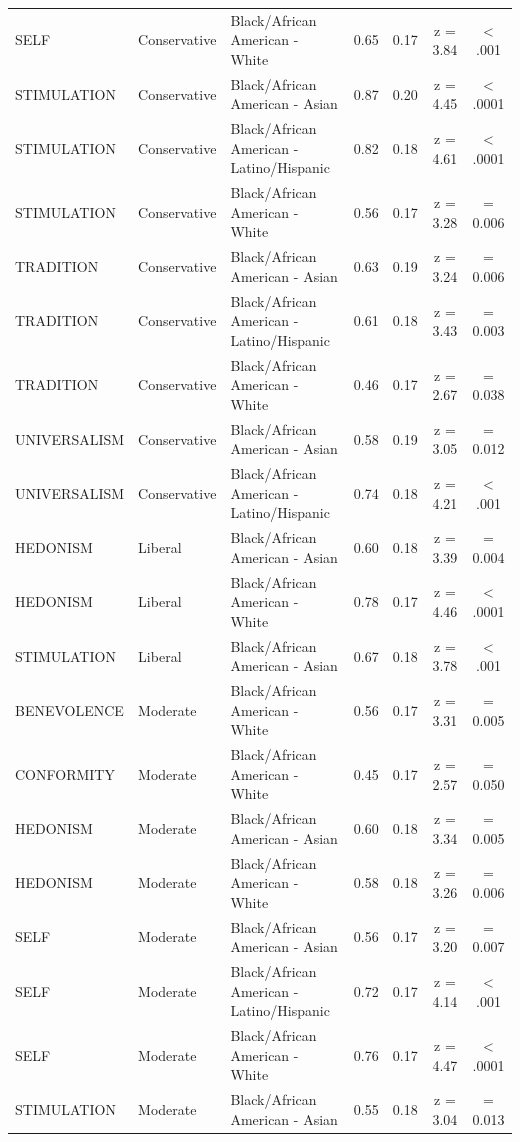 \begin{table}[t]
\begin{tabular*}{\linewidth}{@{\extracolsep{\fill}}lllcccc}
SELF & Conservative & Black/African American - White & 0.65 & 0.17 & z = 3.84 & < .001 \\ 
STIMULATION & Conservative & Black/African American - Asian & 0.87 & 0.20 & z = 4.45 & < .0001 \\ 
STIMULATION & Conservative & Black/African American - Latino/Hispanic & 0.82 & 0.18 & z = 4.61 & < .0001 \\ 
STIMULATION & Conservative & Black/African American - White & 0.56 & 0.17 & z = 3.28 & = 0.006 \\ 
TRADITION & Conservative & Black/African American - Asian & 0.63 & 0.19 & z = 3.24 & = 0.006 \\ 
TRADITION & Conservative & Black/African American - Latino/Hispanic & 0.61 & 0.18 & z = 3.43 & = 0.003 \\ 
TRADITION & Conservative & Black/African American - White & 0.46 & 0.17 & z = 2.67 & = 0.038 \\ 
UNIVERSALISM & Conservative & Black/African American - Asian & 0.58 & 0.19 & z = 3.05 & = 0.012 \\ 
UNIVERSALISM & Conservative & Black/African American - Latino/Hispanic & 0.74 & 0.18 & z = 4.21 & < .001 \\ 
HEDONISM & Liberal & Black/African American - Asian & 0.60 & 0.18 & z = 3.39 & = 0.004 \\ 
HEDONISM & Liberal & Black/African American - White & 0.78 & 0.17 & z = 4.46 & < .0001 \\ 
STIMULATION & Liberal & Black/African American - Asian & 0.67 & 0.18 & z = 3.78 & < .001 \\ 
BENEVOLENCE & Moderate & Black/African American - White & 0.56 & 0.17 & z = 3.31 & = 0.005 \\ 
CONFORMITY & Moderate & Black/African American - White & 0.45 & 0.17 & z = 2.57 & = 0.050 \\ 
HEDONISM & Moderate & Black/African American - Asian & 0.60 & 0.18 & z = 3.34 & = 0.005 \\ 
HEDONISM & Moderate & Black/African American - White & 0.58 & 0.18 & z = 3.26 & = 0.006 \\ 
SELF & Moderate & Black/African American - Asian & 0.56 & 0.17 & z = 3.20 & = 0.007 \\ 
SELF & Moderate & Black/African American - Latino/Hispanic & 0.72 & 0.17 & z = 4.14 & < .001 \\ 
SELF & Moderate & Black/African American - White & 0.76 & 0.17 & z = 4.47 & < .0001 \\ 
STIMULATION & Moderate & Black/African American - Asian & 0.55 & 0.18 & z = 3.04 & = 0.013 \\ 

\end{tabular*}
\end{table}
